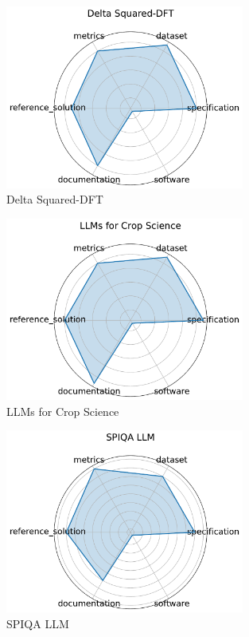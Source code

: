 \documentclass{article}
\begin{document}
\begin{figure}[h!]
  \centering
  \includegraphics[width=0.7\textwidth]{Delta Squared-DFT_radar.pdf}
  \caption{Delta Squared-DFT \cite{liu2024delta2dft}}
\end{figure}

\begin{figure}[h!]
  \centering
  \includegraphics[width=0.7\textwidth]{LLMs for Crop Science_radar.pdf}
  \caption{LLMs for Crop Science \cite{patel2024llmcropsci}}
\end{figure}

\begin{figure}[h!]
  \centering
  \includegraphics[width=0.7\textwidth]{SPIQA LLM_radar.pdf}
  \caption{SPIQA LLM \cite{zhong2024spiqa_llm}}
\end{figure}

\clearpage


\end{document}
